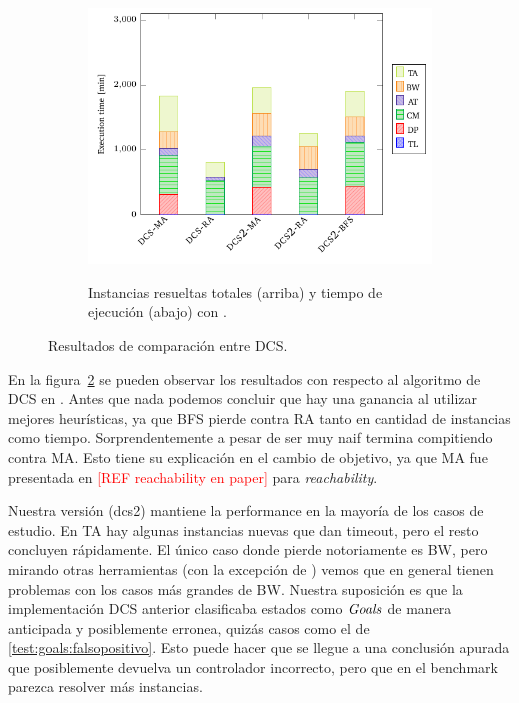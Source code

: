 \begin{figure}[th]
\begin{subfigure}{0.5\textwidth}
        \includegraphics[width=\linewidth]{figures/benchmark/dcs_time.pdf}\label{fig:dcs:results:time}
        \caption{Instancias resueltas totales (arriba) y tiempo de ejecución (abajo) con \DCS.}
    \end{subfigure}
\caption{Resultados de comparación entre DCS.}
\label{fig:dcs:results}
\end{figure}

En la figura~\ref{fig:dcs:results} se pueden observar los resultados con respecto al algoritmo de DCS en \cite{tesisDani}. Antes que nada podemos concluir que hay una ganancia al utilizar mejores heurísticas, ya que BFS pierde contra RA tanto en cantidad de instancias como tiempo. Sorprendentemente a pesar de ser muy naif termina compitiendo contra MA. Esto tiene su explicación en el cambio de objetivo, ya que MA fue presentada en \textcolor{red}{[REF reachability en paper]} para \textit{reachability}.

Nuestra versión (dcs2) mantiene la performance en la mayoría de los casos de estudio. En TA hay algunas instancias nuevas que dan timeout, pero el resto concluyen rápidamente. El único caso donde pierde notoriamente es BW, pero mirando otras herramientas (con la excepción de \MYND) vemos que en general tienen problemas con los casos más grandes de BW. Nuestra suposición es que la implementación DCS anterior clasificaba estados como $\mathit{Goals}$ de manera anticipada y posiblemente erronea, quizás casos como el de \ref{test:goals:falsopositivo}. Esto puede hacer que se llegue a una conclusión apurada que posiblemente devuelva un controlador incorrecto, pero que en el benchmark parezca resolver más instancias.

